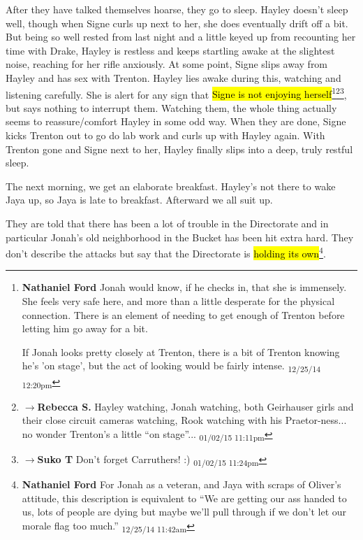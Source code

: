 After they have talked themselves hoarse, they go to sleep.  Hayley doesn't sleep well, though when Signe curls up next to her, she does eventually drift off a bit.  But being so well rested from last night and a little keyed up from recounting her time with Drake, Hayley is restless and keeps startling awake at the slightest noise, reaching for her rifle anxiously.  At some point, Signe slips away from Hayley and has sex with Trenton.  Hayley lies awake during this, watching and listening carefully.  She is alert for any sign that \hl{Signe is not enjoying herself}\footnote{\textbf{Nathaniel Ford }Jonah would know, if he checks in, that she is immensely. She feels very safe here, and more than a little desperate for the physical connection. There is an element of needing to get enough of Trenton before letting him go away for a bit.

If Jonah looks pretty closely at Trenton, there is a bit of Trenton knowing he's 'on stage', but the act of looking would be fairly intense. \textsubscript{12/25/14 12:20pm}}\footnote{$\rightarrow$\textbf{Rebecca S. }Hayley watching, Jonah watching, both Geirhauser girls and their close circuit cameras watching, Rook watching with his Praetor-ness... no wonder Trenton's a little ``on stage''... \textsubscript{01/02/15 11:11pm}}\footnote{$\rightarrow$\textbf{Suko T }Don't forget Carruthers! :) \textsubscript{01/02/15 11:24pm}}, but says nothing to interrupt them.  Watching them, the whole thing actually seems to reassure/comfort Hayley in some odd way.  When they are done, Signe kicks Trenton out to go do lab work and curls up with Hayley again.  With Trenton gone and Signe next to her, Hayley finally slips into a deep, truly restful sleep.





The next morning, we get an elaborate breakfast.  Hayley's not there to wake Jaya up, so Jaya is late to breakfast.  Afterward we all suit up. 



They are told that there has been a lot of trouble in the Directorate and in particular Jonah's old neighborhood in the Bucket has been hit extra hard.  They don't describe the attacks but say that the Directorate is \hl{holding its own}\footnote{\textbf{Nathaniel Ford }For Jonah as a veteran, and Jaya with scraps of Oliver's attitude, this description is equivalent to ``We are getting our ass handed to us, lots of people are dying but maybe we'll pull through if we don't let our morale flag too much.'' \textsubscript{12/25/14 11:42am}}.

